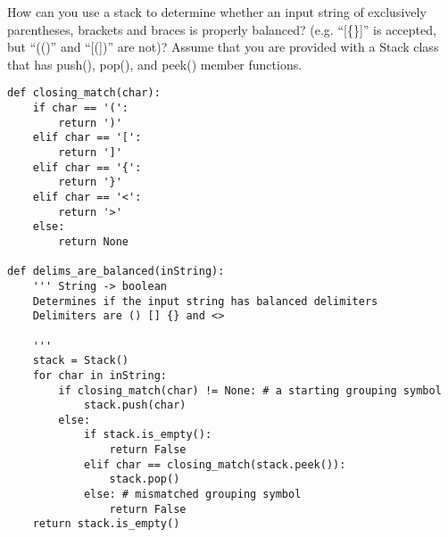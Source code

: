 How can you use a stack to determine whether an input string of exclusively
      parentheses, brackets and braces is properly balanced? (e.g. ``[\{\}]'' is accepted, but
      ``(()'' and ``[(])'' are not)?
      Assume that you are provided with a Stack class that has push(), pop(), and peek() member functions.

    \begin{answer}
    \begin{lstlisting} 
def closing_match(char):
	if char == '(':
		return ')'
	elif char == '[':
		return ']'
	elif char == '{':
		return '}'
	elif char == '<':
		return '>'
	else:
		return None

def delims_are_balanced(inString):
    ''' String -> boolean
    Determines if the input string has balanced delimiters
    Delimiters are () [] {} and <>  
    
    '''
    stack = Stack()
    for char in inString:
        if closing_match(char) != None: # a starting grouping symbol
            stack.push(char)
		else:
			if stack.is_empty():
				return False
			elif char == closing_match(stack.peek()):
				stack.pop()
			else: # mismatched grouping symbol
				return False
    return stack.is_empty()
    \end{lstlisting}
    \end{answer}